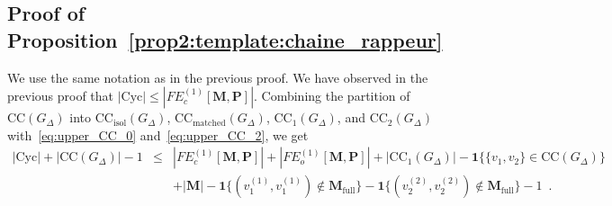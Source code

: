 \documentclass{article}
\begin{document}
\subsection{Proof of Proposition~\ref{prop2:template:chaine_rappeur}}
We use the same notation as in the previous proof.         
We have observed in the previous proof that 
$|\mathrm{Cyc}|\leq |FE_c^{(1)}[\mathbf{M},\mathbf{P}]|$. 
Combining the partition of $\mathrm{CC}(G_{\Delta})$ into $\mathrm{CC}_{\mathrm{isol}}(G_{\Delta})$, $\mathrm{CC}_{\mathrm{matched}}(G_{\Delta})$, $\mathrm{CC}_{1}(G_{\Delta})$, and $\mathrm{CC}_{2}(G_{\Delta})$ with~\eqref{eq:upper_CC_0} and~\eqref{eq:upper_CC_2}, we get
\begin{eqnarray} \nonumber
|\mathrm{Cyc}| + |\mathrm{CC}(G_{\Delta})|-1 & \leq& |FE_c^{(1)}[\mathbf{M},\mathbf{P}]|+ |FE_o^{(1)}[\mathbf{M},\mathbf{P}]|+ |\mathrm{CC}_{1}(G_{\Delta})| - \mathbf{1}\{\{v_1,v_2\}\in \mathrm{CC}(G_{\Delta})\}\\ & &+ |\mathbf{M}|-\mathbf{1}\{(v^{(1)}_1,v^{(1)}_1)\notin \mathbf{M}_{\mathrm{full}}\} -\mathbf{1}\{(v^{(2)}_2,v^{(2)}_2) \notin \mathbf{M}_{\mathrm{full}}\} - 1 \enspace . \label{eq:prop2:chain}
\end{eqnarray}
\end{document}
